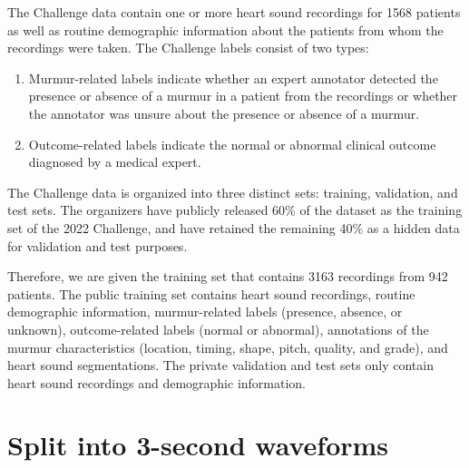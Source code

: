 \documentclass[twocolumn]{cinc}
\begin{document}
The Challenge data contain one or more heart sound recordings for 1568 patients as well as routine demographic information about the patients from whom the recordings were taken. The Challenge labels consist of two types:

\begin{enumerate}
\item Murmur-related labels indicate whether an expert annotator detected the presence or absence of a murmur in a patient from the recordings or whether the annotator was unsure about the presence or absence of a murmur.
\item Outcome-related labels indicate the normal or abnormal clinical outcome diagnosed by a medical expert.
\end{enumerate}

The Challenge data is organized into three distinct sets: training, validation, and test sets. The organizers have publicly released 60\% of the dataset as the training set of the 2022 Challenge, and have retained the remaining 40\% as a hidden data for validation and test purposes. 

Therefore, we are given the training set that contains 3163 recordings from 942 patients. The public training set contains heart sound recordings, routine demographic information, murmur-related labels (presence, absence, or unknown), outcome-related labels (normal or abnormal), annotations of the murmur characteristics (location, timing, shape, pitch, quality, and grade), and heart sound segmentations. The private validation and test sets only contain heart sound recordings and demographic information.


%
%
%



\section{Split into 3-second waveforms}
\end{document}
